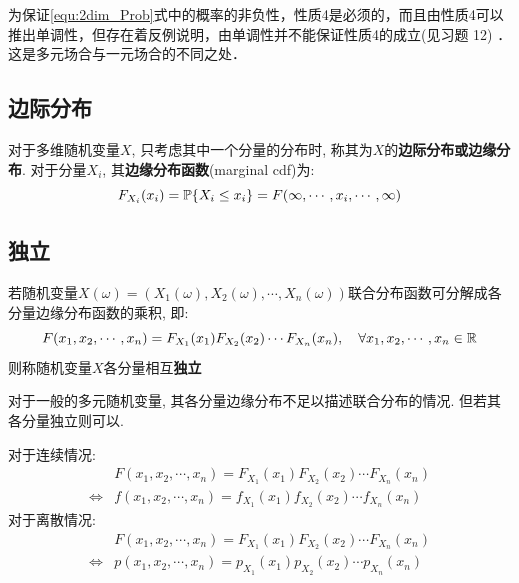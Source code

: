 为保证\ref{equ:2dim_Prob}式中的概率的非负性，性质4是必须的，而且由性质4可以推出单调性，但存在着反例说明，由单调性并不能保证性质4的成立(见习题 12) ．这是多元场合与一元场合的不同之处．

\subsection{边际分布}

\begin{definition}
    对于多维随机变量$X$, 只考虑其中一个分量的分布时, 称其为$X$的\textbf{边际分布或边缘分布}. 对于分量$X_i$, 其\textbf{边缘分布函数}(marginal cdf)为:
    \[ F_{X_i}(x_i) = \P\{ X_i \le x_i \} = F(\infty,\cdots , x_i ,\cdots ,\infty)\]
\end{definition}



\subsection{独立}

\begin{definition}[独立随机变量]
    若随机变量$X(\omega) = (X_1(\omega), X_2(\omega),\cdots , X_n(\omega))$联合分布函数可分解成各分量边缘分布函数的乘积, 即:
    \[ F(x_1,x_2,\cdots ,x_n) = F_{X_1}(x_1)F_{X_2}(x_2)\cdots F_{X_n}(x_n) , \quad \forall x_1,x_2,\cdots ,x_n \in \R \]
    则称随机变量$X$各分量相互\textbf{独立}
\end{definition}

\begin{remark}
    对于一般的多元随机变量, 其各分量边缘分布不足以描述联合分布的情况. 但若其各分量独立则可以.
\end{remark}

\begin{theorem}
    对于连续情况:
    \begin{align*}
                        & F(x_1,x_2,\cdots ,x_n) = F_{X_1}(x_1)F_{X_2}(x_2)\cdots F_{X_n}(x_n) \\
        \Leftrightarrow & f(x_1,x_2,\cdots ,x_n) = f_{X_1}(x_1)f_{X_2}(x_2)\cdots f_{X_n}(x_n)
    \end{align*}
    对于离散情况:
    \begin{align*}
                        & F(x_1,x_2,\cdots ,x_n) = F_{X_1}(x_1)F_{X_2}(x_2)\cdots F_{X_n}(x_n) \\
        \Leftrightarrow & p(x_1,x_2,\cdots ,x_n) = p_{X_1}(x_1)p_{X_2}(x_2)\cdots p_{X_n}(x_n)
    \end{align*}
\end{theorem}

